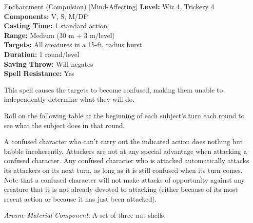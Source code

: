 {Enchantment (Compulsion) [Mind-Affecting]}
{
	\textbf{Level:}
	Wiz 4, Trickery 4\\
	\textbf{Components:}
	V, S, M/DF\\
	\textbf{Casting Time:}
	1 standard action\\
	\textbf{Range:}
	Medium (30 m + 3 m/level)\\
	\textbf{Targets:}
	All creatures in a 15-ft. radius burst\\
	\textbf{Duration:}
	1 round/level\\
	\textbf{Saving Throw:}
	Will negates\\
	\textbf{Spell Resistance:}
	Yes\\
}
{
	This spell causes the targets to become confused, making them unable to independently determine what they will do.

	Roll on the following table at the beginning of each subject's turn each round to see what the subject does in that round.

	A confused character who can't carry out the indicated action does nothing but babble incoherently. Attackers are not at any special advantage when attacking a confused character. Any confused character who is attacked automatically attacks its attackers on its next turn, as long as it is still confused when its turn comes. Note that a confused character will not make attacks of opportunity against any creature that it is not already devoted to attacking (either because of its most recent action or because it has just been attacked).

	\textit{Arcane Material Component}:
	A set of three nut shells.

}
